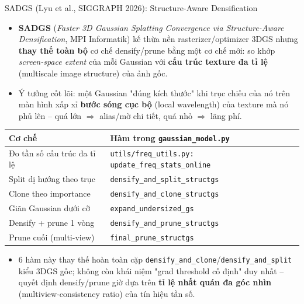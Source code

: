 
\begin{frame}{SADGS (Lyu et al., SIGGRAPH 2026): Structure-Aware Densification}
\footnotesize
\begin{itemize}
    \item \textbf{SADGS} (\emph{Faster 3D Gaussian Splatting Convergence via Structure-Aware Densification}, MPI Informatik) kế thừa nền rasterizer/optimizer 3DGS nhưng \textbf{thay thế toàn bộ} cơ chế densify/prune bằng một cơ chế mới: so khớp \emph{screen-space extent} của mỗi Gaussian với \textbf{cấu trúc texture đa tỉ lệ} (multiscale image structure) của ảnh gốc.
    \item Ý tưởng cốt lõi: một Gaussian "đúng kích thước" khi trục chiếu của nó trên màn hình xấp xỉ \textbf{bước sóng cục bộ} (local wavelength) của texture mà nó phủ lên -- quá lớn $\Rightarrow$ alias/mờ chi tiết, quá nhỏ $\Rightarrow$ lãng phí.
\end{itemize}
\begin{table}
\centering
\begin{tabular}{ll}
\toprule
\textbf{Cơ chế} & \textbf{Hàm trong \texttt{gaussian\_model.py}} \\
\midrule
Đo tần số cấu trúc đa tỉ lệ & \texttt{utils/freq\_utils.py: update\_freq\_stats\_online} \\
Split dị hướng theo trục & \texttt{densify\_and\_split\_structgs} \\
Clone theo importance & \texttt{densify\_and\_clone\_structgs} \\
Giãn Gaussian dưới cỡ & \texttt{expand\_undersized\_gs} \\
Densify + prune 1 vòng & \texttt{densify\_and\_prune\_structgs} \\
Prune cuối (multi-view) & \texttt{final\_prune\_structgs} \\
\bottomrule
\end{tabular}
\end{table}
\begin{itemize}
    \item[$\Rightarrow$] 6 hàm này thay thế hoàn toàn cặp \texttt{densify\_and\_clone}/\texttt{densify\_and\_split} kiểu 3DGS gốc; không còn khái niệm "grad threshold cố định" duy nhất -- quyết định densify/prune giờ dựa trên \textbf{tỉ lệ nhất quán đa góc nhìn} (multiview-consistency ratio) của tín hiệu tần số.

\end{itemize}
\end{frame}
